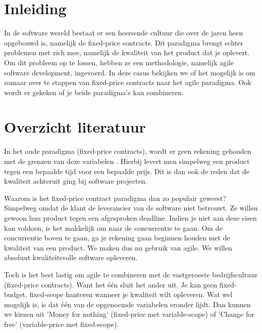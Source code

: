 \documentclass{hogent-article}
\affiliation{
    \textsuperscript{1} \href{mailto:nante.vermeulen@student.hogent.be}{nante.vermeulen@student.hogent.be}}
\affiliation{
    \textsuperscript{2} \href{mailto:mout.pessemier@student.hogent.be}{mout.pessemier@student.hogent.be}}
\affiliation{
    \textsuperscript{3} \href{mailto:indy.vancanegem@student.hogent.be}{indy.vancanegem@student.hogent.be}}
\affiliation{
    \textsuperscript{4} \href{mailto:jef.malfliet@student.hogent.be}{jef.malfliet@student.hogent.be}
}
\begin{document}
	
    \flushbottom
    \tableofcontents 
    \thispagestyle{empty} %
	
	\section{Inleiding}
	
	In de software wereld bestaat er een heersende cultuur die over de jaren heen opgebouwd is, namelijk de fixed-price contracts. Dit paradigma brengt echter problemen met zich mee, namelijk de kwaliteit van het product dat je oplevert. Om dit probleem op te lossen, hebben ze een methodologie, namelijk agile software development, ingevoerd. In deze casus bekijken we of het mogelijk is om zomaar over te stappen van fixed-price contracts naar het agile paradigma. Ook wordt er gekeken of je beide paradigma's kan combineren. 
	
	\section{Overzicht literatuur}
	
	In het oude paradigma (fixed-price contracts), wordt er geen
	rekening gehouden met de grenzen van deze variabelen 	\autocite{Scrumology2012}. Hierbij levert men simpelweg een product tegen een bepaalde
	tijd voor een bepaalde prijs. Dit is dan ook de reden dat de kwaliteit achteruit ging bij software projecten. 
	
	Waarom is het fixed-price contract paradigma dan zo populair geweest? 
	Simpelweg omdat de klant de leverancier van de software niet betrouwt. Ze willen gewoon hun product tegen een 
	afgesproken deadline. Indien je niet aan deze eisen kan voldoen, is het makkelijk om naar de concurrentie te gaan. 
	Om de concurrentie boven te gaan, ga je rekening gaan beginnen houden met de kwaliteit van een product. We maken
	dus nu gebruik van agile. We willen absoluut kwaliteitsvolle software opleveren. 
	
	Toch is het best lastig om agile te combineren met de vastgeroeste bedrijfscultuur (fixed-price contracts). Want
	het één sluit het ander uit. Je kan geen fixed-budget, fixed-scope hanteren wanneer je kwaliteit wilt opleveren. 
	Wat wel mogelijk is, is dat één van de opgenoemde variabelen eronder lijdt. Dan kunnen we kiezen uit 
	'Money for nothing' (fixed-price met variable-scope) of 'Change for free' (variable-price met fixed-scope). 
	
\end{document}
